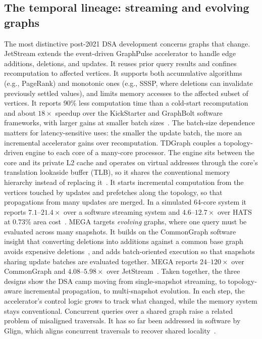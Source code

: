 \documentclass[journal,onecolumn]{IEEEtran}
\begin{document}
\subsection{The temporal lineage: streaming and evolving graphs}
The most distinctive post-2021 DSA development concerns graphs that change. JetStream extends the event-driven GraphPulse accelerator to handle edge additions, deletions, and updates. It reuses prior query results and confines recomputation to affected vertices. It supports both accumulative algorithms (e.g., PageRank) and monotonic ones (e.g., SSSP, where deletions can invalidate previously settled values), and limits memory accesses to the affected subset of vertices. It reports 90\% less computation time than a cold-start recomputation and about $18\times$ speedup over the KickStarter and GraphBolt software frameworks, with larger gains at smaller batch sizes~\cite{rahman2021jetstream}. The batch-size dependence matters for latency-sensitive uses: the smaller the update batch, the more an incremental accelerator gains over recomputation. TDGraph couples a topology-driven engine to each core of a many-core processor. The engine sits between the core and its private L2 cache and operates on virtual addresses through the core's translation lookaside buffer (TLB), so it shares the conventional memory hierarchy instead of replacing it~\cite{zhao2022tdgraph}. It starts incremental computation from the vertices touched by updates and prefetches along the topology, so that propagations from many updates are merged. In a simulated 64-core system it reports $7.1$--$21.4\times$ over a software streaming system and $4.6$--$12.7\times$ over HATS at 0.73\% area cost~\cite{zhao2022tdgraph}. MEGA targets \emph{evolving} graphs, where one query must be evaluated across many snapshots. It builds on the CommonGraph software insight that converting deletions into additions against a common base graph avoids expensive deletions~\cite{afarin2023commongraph}, and adds batch-oriented execution so that snapshots sharing update batches are evaluated together. MEGA reports $24$--$120\times$ over CommonGraph and $4.08$--$5.98\times$ over JetStream~\cite{gao2023mega}. Taken together, the three designs show the DSA camp moving from single-snapshot streaming, to topology-aware incremental propagation, to multi-snapshot evolution. In each step, the accelerator's control logic grows to track what changed, while the memory system stays conventional. Concurrent queries over a shared graph raise a related problem of misaligned traversals. It has so far been addressed in software by Glign, which aligns concurrent traversals to recover shared locality~\cite{yin2023glign}.
\end{document}
